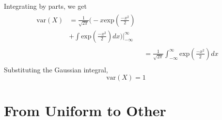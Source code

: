 \documentclass[journal, 12pt, twocolumn]{IEEEtran}
\begin{document}
\begin{enumerate}[label=\arabic{section}.\arabic*]
        Integrating by parts, we get
        \begin{align}
            \begin{split}
            \text{var}(X) &= \frac{1}{\sqrt{2 \pi}}\Bigg(-x \text{exp}\left(\frac{-x^2}{2}\right) \\
            &+ \int{\text{exp}\left(\frac{-x^2}{2}\right) dx}\Bigg) \Bigg|_{-\infty}^{\infty}
            \end{split}
            \\
            &= \frac{1}{\sqrt{2 \pi}} \int_{-\infty}^{\infty}{\text{exp}\left(\frac{-x^2}{2}\right) dx} \\
        \end{align}
        Substituting the Gaussian integral,
        \begin{equation}
            \text{var}(X) = 1
        \end{equation}

\end{enumerate}

\section{From Uniform to Other}
\end{document}
